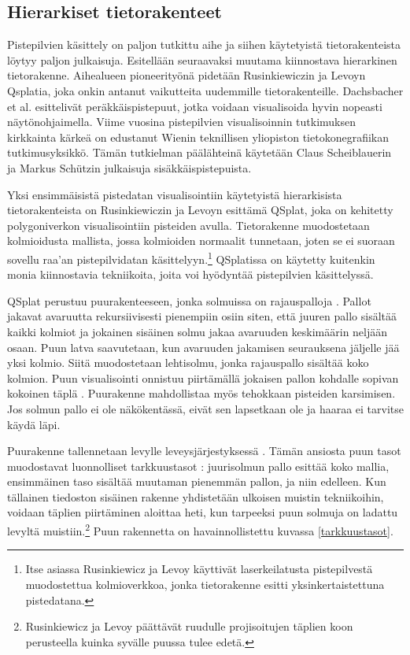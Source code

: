 \subsection{Hierarkiset tietorakenteet}\label{tietorakenteet}

Pistepilvien käsittely on paljon tutkittu aihe ja siihen käytetyistä tietorakenteista löytyy paljon julkaisuja. Esitellään seuraavaksi muutama kiinnostava hierarkinen tietorakenne. Aihealueen pioneerityönä pidetään Rusinkiewiczin ja Levoyn Qsplatia, joka onkin antanut vaikutteita uudemmille tietorakenteille. Dachsbacher et al. esittelivät peräkkäispistepuut, jotka voidaan visualisoida hyvin nopeasti näytönohjaimella. Viime vuosina pistepilvien visualisoinnin tutkimuksen kirkkainta kärkeä on edustanut Wienin teknillisen yliopiston tietokonegrafiikan tutkimusyksikkö. Tämän tutkielman päälähteinä käytetään Claus Scheiblauerin ja Markus Schützin julkaisuja sisäkkäispistepuista.

\subtitle{Qsplat}
Yksi ensimmäisistä pistedatan visualisointiin käytetyistä hierarkisista tietorakenteista on Rusinkiewiczin ja Levoyn esittämä QSplat, joka on kehitetty polygoniverkon visualisointiin pisteiden avulla. Tietorakenne muodostetaan kolmioidusta mallista, jossa kolmioiden normaalit tunnetaan, joten se ei suoraan sovellu raa'an pistepilvidatan käsittelyyn.\footnote{Itse asiassa Rusinkiewicz ja Levoy käyttivät laserkeilatusta pistepilvestä muodostettua kolmioverkkoa, jonka tietorakenne esitti yksinkertaistettuna pistedatana.} QSplatissa on käytetty kuitenkin monia kiinnostavia tekniikoita, joita voi hyödyntää pistepilvien käsittelyssä. \cite{qsplat}

QSplat perustuu puurakenteeseen, jonka solmuissa on rajauspalloja . Pallot jakavat avaruutta rekursiivisesti pienempiin osiin siten, että juuren pallo sisältää kaikki kolmiot ja jokainen sisäinen solmu jakaa avaruuden keskimäärin neljään osaan. Puun latva saavutetaan, kun avaruuden jakamisen seurauksena jäljelle jää yksi kolmio. Siitä muodostetaan lehtisolmu, jonka rajauspallo sisältää koko kolmion. Puun visualisointi onnistuu piirtämällä jokaisen pallon kohdalle sopivan kokoinen täplä . Puurakenne mahdollistaa myös tehokkaan pisteiden karsimisen. Jos solmun pallo ei ole näkökentässä, eivät sen lapsetkaan ole ja haaraa ei tarvitse käydä läpi. \cite{qsplat}

Puurakenne tallennetaan levylle leveysjärjestyksessä . Tämän ansiosta puun tasot muodostavat luonnolliset tarkkuustasot : juurisolmun pallo esittää koko mallia, ensimmäinen taso sisältää muutaman pienemmän pallon, ja niin edelleen. Kun tällainen tiedoston sisäinen rakenne yhdistetään ulkoisen muistin tekniikoihin, voidaan täplien piirtäminen aloittaa heti, kun tarpeeksi puun solmuja on ladattu levyltä muistiin.\footnote{Rusinkiewicz ja Levoy päättävät ruudulle projisoitujen täplien koon perusteella kuinka syvälle puussa tulee edetä.} Puun rakennetta on havainnollistettu kuvassa \ref{tarkkuustasot}. \cite{qsplat}

